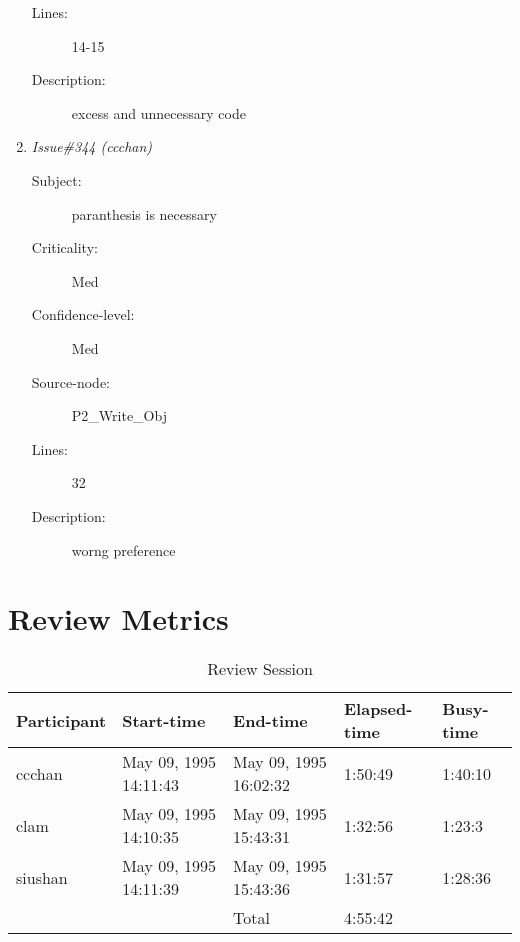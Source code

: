 \begin{enumerate}
\begin{description}
\item [Lines:] 14-15

\item [Description:] excess and unnecessary code
\end{description}
\item {\it Issue\#344 (ccchan)}
\begin{description}
\item [Subject:] paranthesis is necessary
\item [Criticality:] Med
\item [Confidence-level:] Med
\item [Source-node:] P2\_Write\_Obj

\item [Lines:] 32

\item [Description:] worng preference
\end{description}
\end{enumerate}
\section{Review Metrics}
\begin{table}[hb]
\begin{center}
\begin{tabular}{|l|l|l|l|l|}
\hline
Participant & Start-time & End-time & Elapsed-time & Busy-time \\
\hline
ccchan & May 09, 1995 14:11:43 & May 09, 1995 16:02:32 & 1:50:49 & 1:40:10 \\
clam & May 09, 1995 14:10:35 & May 09, 1995 15:43:31 & 1:32:56 & 1:23:3 \\
siushan & May 09, 1995 14:11:39 & May 09, 1995 15:43:36 & 1:31:57 & 1:28:36 \\
\hline
 & & Total & 4:55:42 & \\
\hline
\end{tabular}
\end{center}
\caption{Review Session}
\end{table}


